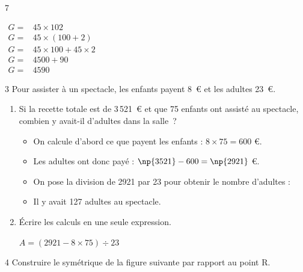 \documentclass[a4paper]{book}
\begin{document}
{\begin{exerciceNote}{7}
\begin{minipage}{0.3\linewidth}
            \bigskip

            $\begin{array}{ll}
                G = & 45 \times 102 \\[2ex]
                G = & 45 \times (100 + 2) \\[2ex]
                G = & 45 \times 100 + 45 \times 2 \\[2ex]
                G = & 4500+90 \\[2ex]
                G = & 4590
            \end{array}$
        \end{minipage}
    \end{exerciceNote}


    \begin{exerciceNote}{3}
        Pour assister à un spectacle, les enfants payent 8~\euro{} et les adultes 23~\euro{}.

        \begin{enumerate}[leftmargin=*]
            \item Si la recette totale est de 3\,521~\euro{} et que 75 enfants ont assisté au spectacle, combien y avait-il d'adultes dans la salle~?

            \begin{itemize}
                \item On calcule d'abord ce que payent les enfants : $8\times75=600$ \euro{}.

                \item Les adultes ont donc payé : $\np{3521}-600=\np{2921}$ \euro{}.

                \item On pose la division de 2921 par 23 pour obtenir le nombre d'adultes : 

                \item Il y avait 127 adultes au spectacle.
            \end{itemize}
            
            \item Écrire les calculs en une seule expression.

            $A=(2921-8\times75)\div23$
            
        \end{enumerate}
    \end{exerciceNote}


\newpage


    \begin{exerciceNote}{4}
        Construire le symétrique de la figure suivante par rapport au point R.


\end{exerciceNote}}
\end{document}
